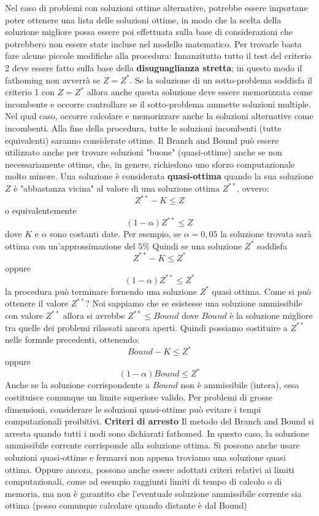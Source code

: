 \documentclass[12pt]{article}
\begin{document}
Nel caso di problemi con soluzioni ottime alternative, potrebbe essere importane poter ottenere una lista delle soluzioni ottime, in modo che la scelta della soluzione migliore possa essere poi effettuata sulla base di considerazioni
che potrebbero non essere state incluse nel modello matematico. Per trovarle basta fare alcune piccole modifiche alla procedura: \newline
Innanzitutto tutto il test del criterio 2 deve essere fatto sulla base della \textbf{disuguaglianza stretta}; in questo modo il fathoming non avverrà se $Z = Z^*$.
Se la soluzione di un sotto-problema soddisfa il criterio 1 con $Z = Z^*$ allora anche questa soluzione deve essere memorizzata come incombente e occorre controllare se il sotto-problema ammette soluzioni
multiple. Nel qual caso, occorre calcolare e memorizzare anche la soluzioni alternative come incombenti.
Alla fine della procedura, tutte le soluzioni incombenti (tutte equivalenti) saranno considerate ottime. \newline
Il Branch and Bound può essere utilizzato anche per trovare soluzioni "buone" (quasi-ottime) anche se non necessariamente ottime, che, in genere,
richiedono uno sforzo computazionale molto minore. Una soluzione è considerata \textbf{quasi-ottima} quando la sua soluzione $Z$ è "abbastanza vicina" al valore di una soluzione
ottima $Z^{**}$, ovvero:
$$Z^{**} - K \leq Z$$
o equivalentemente
$$(1-\alpha)Z^{**} \leq Z$$
dove $K$ e $\alpha$ sono costanti date.
Per esempio, se $\alpha = 0,05$ la soluzione trovata sarà ottima con un'approssimazione del $5\%$
Quindi se una soluzione $Z^*$ soddisfa
$$Z^{**} - K \leq Z^*$$
oppure
$$(1-\alpha)Z^{**} \leq Z^*$$
la procedura può terminare fornendo una soluzione $Z^*$ quasi ottima. \newline
Come si può ottenere il valore $Z^{**}$?
Noi sappiamo che se esistesse una soluzione ammissibile con valore $Z^{**}$ allora si avrebbe $Z^{**} \leq Bound$
dove $Bound$ è la soluzione migliore tra quelle dei problemi rilassati ancora aperti.
Quindi possiamo sostituire a $Z^{**}$ nelle formule precedenti, ottenendo:
$$Bound - K \leq Z^{*}$$
oppure
$$(1- \alpha)Bound \leq Z^*$$
Anche se la soluzione corrispondente a $Bound$ non è ammissibile (intera), essa costituisce comunque  un limite superiore valido.
Per problemi di grosse dimensioni, considerare le soluzioni quasi-ottime può evitare i tempi computazionali proibitivi. \newline
\textbf{Criteri di arresto} \newline
Il metodo del Branch and Bound si arresta quando tutti i nodi sono dichiarati fathomed.
In questo caso, la soluzione ammissibile corrente corrisponde alla soluzione ottima.
Si possono anche usare soluzioni quasi-ottime e fermarci non appena troviamo una soluzione quasi ottima.
Oppure ancora, possono anche essere adottati criteri relativi ai limiti computazionali, come ad esempio raggiunti limiti di tempo
di calcolo o di memoria, ma non è garantito che l'eventuale soluzione ammissibile corrente sia ottima (posso comunque calcolare quando distante è dal Bound)
\end{document}
